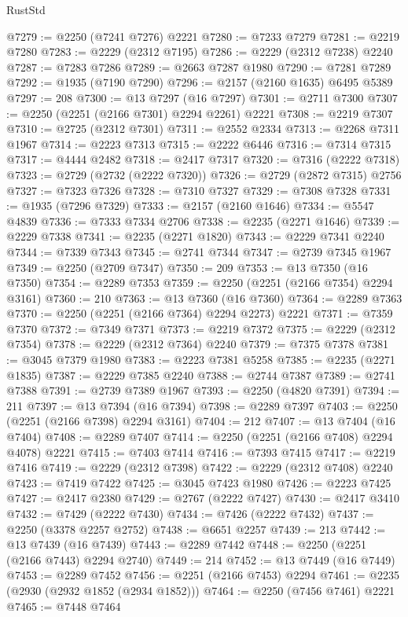 \begin{lexlean}{RustStd}
\begin{coremodule}
@7279 := @2250 (@7241 @7276) @2221
@7280 := @7233 @7279
@7281 := @2219 @7280
@7283 := @2229 (@2312 @7195)
@7286 := @2229 (@2312 @7238) @2240
@7287 := @7283 @7286
@7289 := @2663 @7287 @1980
@7290 := @7281 @7289
@7292 := @1935 (@7190 @7290)
@7296 := @2157 (@2160 @1635) @6495 @5389
@7297 := 208
@7300 := @13 @7297 (@16 @7297)
@7301 := @2711 @7300
@7307 := @2250 (@2251 (@2166 @7301) @2294 @2261) @2221
@7308 := @2219 @7307
@7310 := @2725 (@2312 @7301)
@7311 := @2552 @2334
@7313 := @2268 @7311 @1967
@7314 := @2223 @7313
@7315 := @2222 @6446
@7316 := @7314 @7315
@7317 := @4444 @2482
@7318 := @2417 @7317
@7320 := @7316 (@2222 @7318)
@7323 := @2729 (@2732 (@2222 @7320))
@7326 := @2729 (@2872 @7315) @2756
@7327 := @7323 @7326
@7328 := @7310 @7327
@7329 := @7308 @7328
@7331 := @1935 (@7296 @7329)
@7333 := @2157 (@2160 @1646)
@7334 := @5547 @4839
@7336 := @7333 @7334 @2706
@7338 := @2235 (@2271 @1646)
@7339 := @2229 @7338
@7341 := @2235 (@2271 @1820)
@7343 := @2229 @7341 @2240
@7344 := @7339 @7343
@7345 := @2741 @7344
@7347 := @2739 @7345 @1967
@7349 := @2250 (@2709 @7347)
@7350 := 209
@7353 := @13 @7350 (@16 @7350)
@7354 := @2289 @7353
@7359 := @2250 (@2251 (@2166 @7354) @2294 @3161)
@7360 := 210
@7363 := @13 @7360 (@16 @7360)
@7364 := @2289 @7363
@7370 := @2250 (@2251 (@2166 @7364) @2294 @2273) @2221
@7371 := @7359 @7370
@7372 := @7349 @7371
@7373 := @2219 @7372
@7375 := @2229 (@2312 @7354)
@7378 := @2229 (@2312 @7364) @2240
@7379 := @7375 @7378
@7381 := @3045 @7379 @1980
@7383 := @2223 @7381 @5258
@7385 := @2235 (@2271 @1835)
@7387 := @2229 @7385 @2240
@7388 := @2744 @7387
@7389 := @2741 @7388
@7391 := @2739 @7389 @1967
@7393 := @2250 (@4820 @7391)
@7394 := 211
@7397 := @13 @7394 (@16 @7394)
@7398 := @2289 @7397
@7403 := @2250 (@2251 (@2166 @7398) @2294 @3161)
@7404 := 212
@7407 := @13 @7404 (@16 @7404)
@7408 := @2289 @7407
@7414 := @2250 (@2251 (@2166 @7408) @2294 @4078) @2221
@7415 := @7403 @7414
@7416 := @7393 @7415
@7417 := @2219 @7416
@7419 := @2229 (@2312 @7398)
@7422 := @2229 (@2312 @7408) @2240
@7423 := @7419 @7422
@7425 := @3045 @7423 @1980
@7426 := @2223 @7425
@7427 := @2417 @2380
@7429 := @2767 (@2222 @7427)
@7430 := @2417 @3410
@7432 := @7429 (@2222 @7430)
@7434 := @7426 (@2222 @7432)
@7437 := @2250 (@3378 @2257 @2752)
@7438 := @6651 @2257
@7439 := 213
@7442 := @13 @7439 (@16 @7439)
@7443 := @2289 @7442
@7448 := @2250 (@2251 (@2166 @7443) @2294 @2740)
@7449 := 214
@7452 := @13 @7449 (@16 @7449)
@7453 := @2289 @7452
@7456 := @2251 (@2166 @7453) @2294
@7461 := @2235 (@2930 (@2932 @1852 (@2934 @1852)))
@7464 := @2250 (@7456 @7461) @2221
@7465 := @7448 @7464

\end{coremodule}
\end{lexlean}
